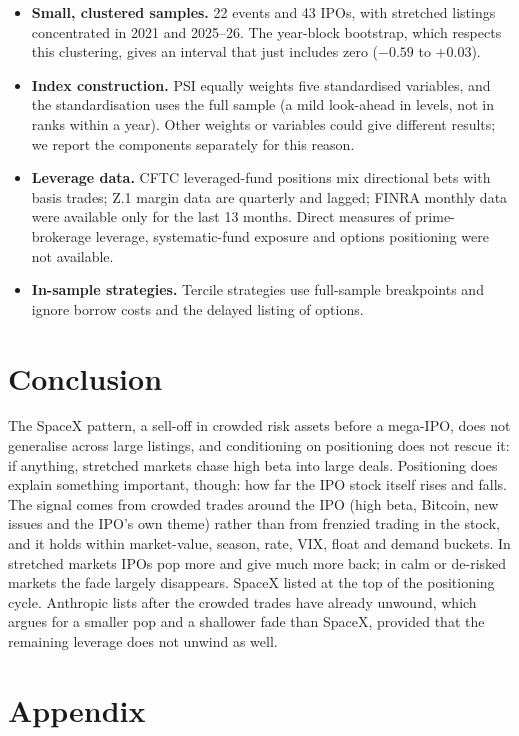 \documentclass[11pt]{article}
\begin{document}
\begin{itemize}
\item \textbf{Small, clustered samples.} 22 events and 43 IPOs, with stretched listings concentrated in 2021 and 2025--26. The year-block bootstrap, which respects this clustering, gives an interval that just includes zero ($-0.59$ to $+0.03$).
\item \textbf{Index construction.} PSI equally weights five standardised variables, and the standardisation uses the full sample (a mild look-ahead in levels, not in ranks within a year). Other weights or variables could give different results; we report the components separately for this reason.
\item \textbf{Leverage data.} CFTC leveraged-fund positions mix directional bets with basis trades; Z.1 margin data are quarterly and lagged; FINRA monthly data were available only for the last 13 months. Direct measures of prime-brokerage leverage, systematic-fund exposure and options positioning were not available.
\item \textbf{In-sample strategies.} Tercile strategies use full-sample breakpoints and ignore borrow costs and the delayed listing of options.
\end{itemize}

\section{Conclusion}

The SpaceX pattern, a sell-off in crowded risk assets before a mega-IPO, does not generalise across large listings, and conditioning on positioning does not rescue it: if anything, stretched markets chase high beta into large deals. Positioning does explain something important, though: how far the IPO stock itself rises and falls. The signal comes from crowded trades around the IPO (high beta, Bitcoin, new issues and the IPO's own theme) rather than from frenzied trading in the stock, and it holds within market-value, season, rate, VIX, float and demand buckets. In stretched markets IPOs pop more and give much more back; in calm or de-risked markets the fade largely disappears. SpaceX listed at the top of the positioning cycle. Anthropic lists after the crowded trades have already unwound, which argues for a smaller pop and a shallower fade than SpaceX, provided that the remaining leverage does not unwind as well.

\vspace{1em}




\clearpage
\appendix
\section{Appendix}

\end{document}
